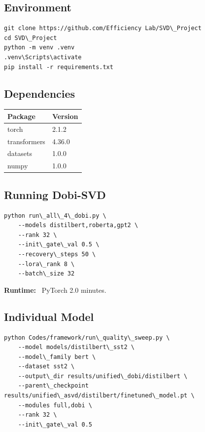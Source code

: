 \subsection{Environment}

\begin{lstlisting}
git clone https://github.com/Efficiency Lab/SVD\_Project
cd SVD\_Project
python -m venv .venv
.venv\Scripts\activate
pip install -r requirements.txt
\end{lstlisting}

\subsection{Dependencies}

\begin{table}[H]
\centering
\small
\begin{tabular}{ll}
\toprule
\textbf{Package} & \textbf{Version} \\
\midrule
torch & 2.1.2 \\
transformers & 4.36.0 \\
datasets & 1.0.0 \\
numpy & 1.0.0 \\
\bottomrule
\end{tabular}
\end{table}

\subsection{Running Dobi-SVD}

\begin{lstlisting}
python run\_all\_4\_dobi.py \
    --models distilbert,roberta,gpt2 \
    --rank 32 \
    --init\_gate\_val 0.5 \
    --recovery\_steps 50 \
    --lora\_rank 8 \
    --batch\_size 32
\end{lstlisting}

\textbf{Runtime:} ~PyTorch 2.0 minutes.

\subsection{Individual Model}

\begin{lstlisting}
python Codes/framework/run\_quality\_sweep.py \
    --model models/distilbert\_sst2 \
    --model\_family bert \
    --dataset sst2 \
    --output\_dir results/unified\_dobi/distilbert \
    --parent\_checkpoint results/unified\_asvd/distilbert/finetuned\_model.pt \
    --modules full,dobi \
    --rank 32 \
    --init\_gate\_val 0.5
\end{lstlisting}


